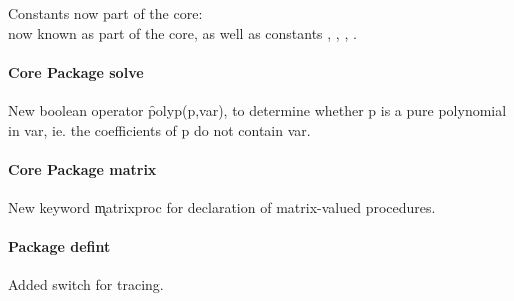 Constants now part of the core:\\
 now known as part of the
core, as well as constants , , ,
.

\paragraph*{Core Package solve}

New boolean operator \f{polyp}(p,var), to determine whether p is a pure polynomial
in var, ie. the coefficients of p do not contain var.

\paragraph*{Core Package matrix}

New keyword \k{matrixproc} for declaration of matrix-valued procedures.

\paragraph{Package defint}

Added  switch for tracing.
